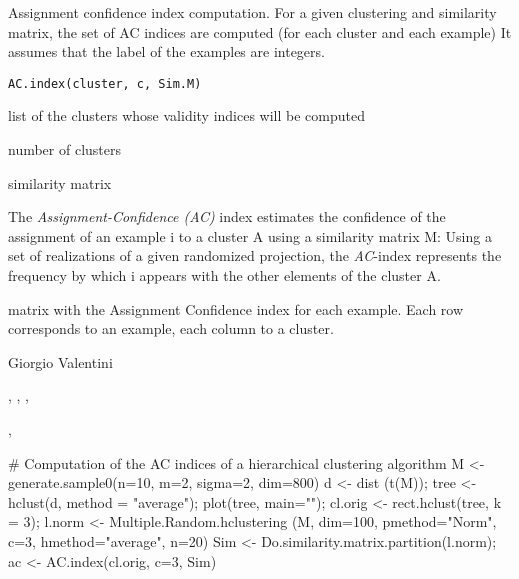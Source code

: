 \documentclass{article}
\begin{document}
\begin{Description}\relax
Assignment confidence index computation.
For a given clustering and similarity matrix, the set of AC indices are computed (for each cluster and each example)
It assumes that the label of the examples are integers.
\end{Description}
\begin{Usage}
\begin{verbatim}
AC.index(cluster, c, Sim.M)
\end{verbatim}
\end{Usage}
\begin{Arguments}
\begin{ldescription}
\item[\code{cluster}] list of the  clusters whose validity indices will be computed 
\item[\code{c}] number of clusters 
\item[\code{Sim.M}] similarity matrix 
\end{ldescription}
\end{Arguments}
\begin{Details}\relax
The \emph{Assignment-Confidence (AC)} index estimates the confidence of the assignment of an example i to a cluster 
A using a similarity matrix M:
Using a set of realizations of a given randomized projection, the  \emph{AC}-index represents the frequency by 
which i appears with the other  elements of the cluster A.
\end{Details}
\begin{Value}
matrix with the Assignment Confidence index for each example. Each row corresponds to an example, 
each column to a cluster.
\end{Value}
\begin{Author}\relax
Giorgio Valentini 
\end{Author}
\begin{SeeAlso}\relax
{}, , ,

, 
\end{SeeAlso}
\begin{Examples}
\begin{ExampleCode}
# Computation of the AC indices of a hierarchical clustering algorithm 
M <- generate.sample0(n=10, m=2, sigma=2, dim=800)
d <- dist (t(M)); 
tree <- hclust(d, method = "average");
plot(tree, main="");
cl.orig <- rect.hclust(tree, k = 3);
l.norm <- Multiple.Random.hclustering (M, dim=100, pmethod="Norm", 
                                       c=3, hmethod="average", n=20)
Sim <- Do.similarity.matrix.partition(l.norm);
ac <- AC.index(cl.orig, c=3, Sim)
\end{ExampleCode}
\end{Examples}
\end{document}
